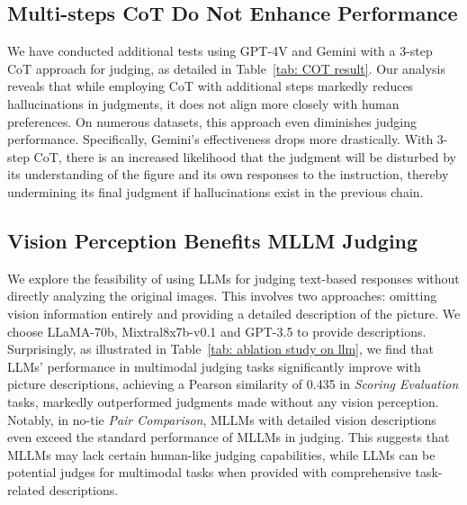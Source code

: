 \subsection{Multi-steps CoT Do Not Enhance Performance}
We have conducted additional tests using GPT-4V and Gemini with a 3-step CoT approach for judging, as detailed in Table~\ref{tab: COT result}. Our analysis reveals that while employing CoT with additional steps markedly reduces hallucinations in judgments, it does not align more closely with human preferences. On numerous datasets, this approach even diminishes judging performance. Specifically, Gemini's effectiveness drops more drastically. With 3-step CoT, there is an increased likelihood that the judgment will be disturbed by its understanding of the figure and its own responses to the instruction, thereby undermining its final judgment if hallucinations exist in the previous chain.

\subsection{Vision Perception Benefits MLLM Judging}
We explore the feasibility of using LLMs for judging text-based responses without directly analyzing the original images. This involves two approaches: omitting vision information entirely and providing a detailed description of the picture. We choose LLaMA-70b, Mixtral8x7b-v0.1 and GPT-3.5 to provide descriptions. 
Surprisingly, as illustrated in Table~\ref{tab: ablation study on llm}, we find that LLMs' performance in multimodal judging tasks significantly improve with picture descriptions, achieving a Pearson similarity of 0.435 in \textit{Scoring Evaluation} tasks, markedly outperformed judgments made without any vision perception. Notably, in no-tie \textit{Pair Comparison}, MLLMs with detailed vision descriptions even exceed the standard performance of MLLMs in judging. This suggests that MLLMs may lack certain human-like judging capabilities, while LLMs can be potential judges for multimodal tasks when provided with comprehensive task-related descriptions.


